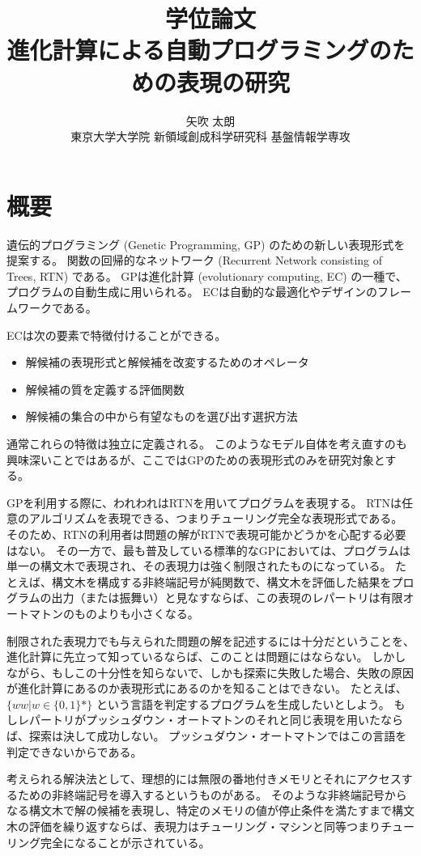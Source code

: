 \documentclass[9pt]{jsarticle}
\title{学位論文\\
進化計算による自動プログラミングのための表現の研究}
\author{矢吹 太朗\\
東京大学大学院 新領域創成科学研究科 基盤情報学専攻}
\date{}
\begin{document}
\maketitle
\section*{概要}

遺伝的プログラミング (Genetic Programming, GP) のための新しい表現形式を提案する。
関数の回帰的なネットワーク (Recurrent Network consisting of Trees, RTN) である。
GPは進化計算 (evolutionary computing, EC) の一種で、プログラムの自動生成に用いられる。
ECは自動的な最適化やデザインのフレームワークである。

ECは次の要素で特徴付けることができる。
\begin{itemize}
  \item 解候補の表現形式と解候補を改変するためのオペレータ
\item 解候補の質を定義する評価関数
  \item 解候補の集合の中から有望なものを選び出す選択方法
\end{itemize}
通常これらの特徴は独立に定義される。
このようなモデル自体を考え直すのも興味深いことではあるが、ここではGPのための表現形式のみを研究対象とする。

GPを利用する際に、われわれはRTNを用いてプログラムを表現する。
RTNは任意のアルゴリズムを表現できる、つまりチューリング完全な表現形式である。
そのため、RTNの利用者は問題の解がRTNで表現可能かどうかを心配する必要はない。
その一方で、最も普及している標準的なGPにおいては、プログラムは単一の構文木で表現され、その表現力は強く制限されたものになっている。
たとえば、構文木を構成する非終端記号が純関数で、構文木を評価した結果をプログラムの出力（または振舞い）と見なすならば、この表現のレパートリは有限オートマトンのものよりも小さくなる。

制限された表現力でも与えられた問題の解を記述するには十分だということを、進化計算に先立って知っているならば、このことは問題にはならない。
しかしながら、もしこの十分性を知らないで、しかも探索に失敗した場合、失敗の原因が進化計算にあるのか表現形式にあるのかを知ることはできない。
たとえば、$\{ww|w\in\{0,1\}*\}$ という言語を判定するプログラムを生成したいとしよう。
もしレパートリがプッシュダウン・オートマトンのそれと同じ表現を用いたならば、探索は決して成功しない。
プッシュダウン・オートマトンではこの言語を判定できないからである。

考えられる解決法として、理想的には無限の番地付きメモリとそれにアクセスするための非終端記号を導入するというものがある。
そのような非終端記号からなる構文木で解の候補を表現し、特定のメモリの値が停止条件を満たすまで構文木の評価を繰り返すならば、表現力はチューリング・マシンと同等つまりチューリング完全になることが示されている。
\end{document}
